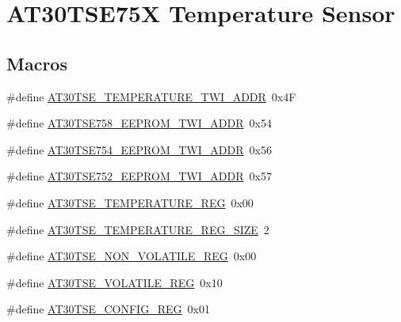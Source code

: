 \hypertarget{group__asfdoc__sam0__at30tse75x__group}{}\section{A\+T30\+T\+S\+E75X Temperature Sensor}
\label{group__asfdoc__sam0__at30tse75x__group}
\subsection*{Macros}
\begin{DoxyCompactItemize}
\item 
\#define \mbox{\hyperlink{group__asfdoc__sam0__at30tse75x__group_ga9b968e6171eecbba7f209350b2d960c0}{A\+T30\+T\+S\+E\+\_\+\+T\+E\+M\+P\+E\+R\+A\+T\+U\+R\+E\+\_\+\+T\+W\+I\+\_\+\+A\+D\+DR}}~0x4F
\item 
\#define \mbox{\hyperlink{group__asfdoc__sam0__at30tse75x__group_ga6074db17014e07451ee90efd9630b7e9}{A\+T30\+T\+S\+E758\+\_\+\+E\+E\+P\+R\+O\+M\+\_\+\+T\+W\+I\+\_\+\+A\+D\+DR}}~0x54
\item 
\#define \mbox{\hyperlink{group__asfdoc__sam0__at30tse75x__group_ga8b8bb2fa6259495c3062fe1e5ab6c5bb}{A\+T30\+T\+S\+E754\+\_\+\+E\+E\+P\+R\+O\+M\+\_\+\+T\+W\+I\+\_\+\+A\+D\+DR}}~0x56
\item 
\#define \mbox{\hyperlink{group__asfdoc__sam0__at30tse75x__group_gaed3314d17a2aa78e44b0d6db8731927c}{A\+T30\+T\+S\+E752\+\_\+\+E\+E\+P\+R\+O\+M\+\_\+\+T\+W\+I\+\_\+\+A\+D\+DR}}~0x57
\item 
\#define \mbox{\hyperlink{group__asfdoc__sam0__at30tse75x__group_ga090733c713266adcbd9ad2b1eff38570}{A\+T30\+T\+S\+E\+\_\+\+T\+E\+M\+P\+E\+R\+A\+T\+U\+R\+E\+\_\+\+R\+EG}}~0x00
\item 
\#define \mbox{\hyperlink{group__asfdoc__sam0__at30tse75x__group_gadae7457b32e4d7b787e075ddfc0bc77d}{A\+T30\+T\+S\+E\+\_\+\+T\+E\+M\+P\+E\+R\+A\+T\+U\+R\+E\+\_\+\+R\+E\+G\+\_\+\+S\+I\+ZE}}~2
\item 
\#define \mbox{\hyperlink{group__asfdoc__sam0__at30tse75x__group_gab7d5ef157346bca010113793bcccd23e}{A\+T30\+T\+S\+E\+\_\+\+N\+O\+N\+\_\+\+V\+O\+L\+A\+T\+I\+L\+E\+\_\+\+R\+EG}}~0x00
\item 
\#define \mbox{\hyperlink{group__asfdoc__sam0__at30tse75x__group_ga67f0773dae984b401271f813570f1de1}{A\+T30\+T\+S\+E\+\_\+\+V\+O\+L\+A\+T\+I\+L\+E\+\_\+\+R\+EG}}~0x10
\item 
\#define \mbox{\hyperlink{group__asfdoc__sam0__at30tse75x__group_ga8500fbe1c8bb5121ec9a33f2f71ed596}{A\+T30\+T\+S\+E\+\_\+\+C\+O\+N\+F\+I\+G\+\_\+\+R\+EG}}~0x01

\end{DoxyCompactItemize}
